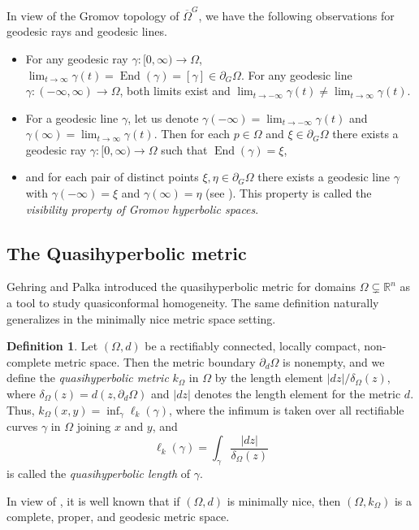 \documentclass[a4paper,12pt]{amsart}
\theoremstyle{definition}
\newtheorem{defn}{Definition}[section]
\newcounter {own}
\begin{document}
In view of the Gromov topology of $\overline{\Omega}^G$, we have the following observations for geodesic rays and geodesic lines.
\begin{itemize}
	\item For any geodesic ray $\gamma:[0,\infty)\to \Omega$,
	$\lim_{t\to\infty}\gamma(t)=\operatorname{End}(\gamma)=[\gamma]\in \partial_{G}\Omega$.
	For any geodesic line $\gamma:(-\infty,\infty)\to \Omega$, both limits exist and
	$\lim_{t\to-\infty}\gamma(t)\ne\lim_{t\to \infty}\gamma(t)$.
	\item For a geodesic line $\gamma$, let us denote $\gamma(-\infty)=\lim_{t\to-\infty}\gamma(t)$ and $\gamma(\infty)=\lim_{t\to \infty}\gamma(t)$. Then for each $p\in \Omega$ and $\xi\in \partial_{G}\Omega$ there exists a geodesic ray $\gamma:[0,\infty)\to \Omega$ such that $\operatorname{End}(\gamma)=\xi$,
	\item and for each pair of distinct points $\xi, \eta\in \partial_{G}\Omega$ there exists a geodesic line $\gamma$ with $\gamma(-\infty)=\xi$ and $\gamma(\infty)=\eta$ (see \cite[Chapter III.H.3, Lemmas 3.1 and 3.2]{Bridson-book}). This property is called the \emph{visibility property of Gromov hyperbolic spaces}.
\end{itemize}
	
	
	
	
\subsection{The Quasihyperbolic metric}\label{QH metric}
Gehring and Palka \cite{Gehring-1976} introduced the quasihyperbolic metric for domains $\Omega\subsetneq \mathbb{R}^n$ as a tool to study quasiconformal homogeneity. The same definition naturally generalizes in the minimally nice metric space setting. 
\begin{defn}
Let $(\Omega,d)$ be a rectifiably connected, locally compact, non-complete metric space. Then the metric boundary $\partial_d\Omega$ is nonempty, and we define the {\it quasihyperbolic metric} $k_{\Omega}$ in $\Omega$ by the length element $|dz|/\delta_{\Omega}(z)$, where $\delta_\Omega(z)=d(z,\partial_d\Omega)$ and $|dz|$ denotes the length element for the metric $d$. Thus,
$k_{\Omega}(x,y)=\inf_{\gamma}\ell_{k}(\gamma)$, where the infimum is taken over all rectifiable curves $\gamma$ in $\Omega$ joining $x$ and $y$, and
$$\ell_{k}(\gamma)=\int_{\gamma}\frac{|dz|}{\delta_{\Omega}(z)}$$
is called the {\it quasihyperbolic length} of $\gamma$.
\end{defn}
In view of \cite[Proposition 2.8]{BHK}, it is well known that if $(\Omega,d)$ is minimally nice, then $(\Omega,k_{\Omega})$ is a complete, proper, and geodesic metric space.
\end{document}

